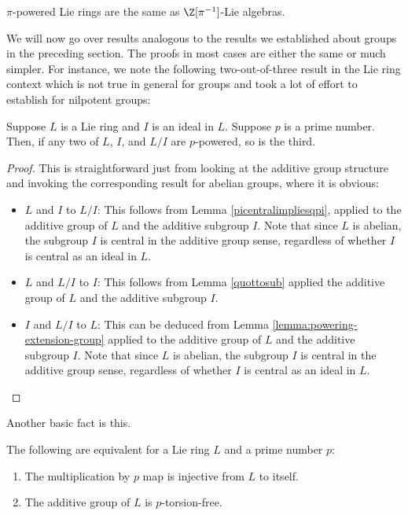 \documentclass{ucetd}
\begin{document}
$\pi$-powered Lie rings are the same as $\Z[\pi^{-1}]$-Lie
algebras. %

We will now go over results analogous to the results we established
about groups in the preceding section. The proofs in most cases are
either the same or much simpler. For instance, we note the following
two-out-of-three result in the Lie ring context which is not true in
general for groups and took a lot of effort to establish for nilpotent groups:

\begin{lemma}\label{lemma:two-out-of-three-lie}
  Suppose $L$ is a Lie ring and $I$ is an ideal in $L$. Suppose $p$ is
  a prime number. Then, if any two of $L$, $I$, and $L/I$ are $p$-powered,
  so is the third.
\end{lemma}

\begin{proof}
  This is straightforward just from looking at the additive group
  structure and invoking the corresponding result for abelian groups,
  where it is obvious:

  \begin{itemize}
  \item $L$ and $I$ to $L/I$: This follows from Lemma
    \ref{picentralimpliesqpi}, applied to the additive group of $L$
    and the additive subgroup $I$.  Note that since $L$ is abelian,
    the subgroup $I$ is central in the additive group sense,
    regardless of whether $I$ is central as an ideal in $L$.
  \item $L$ and $L/I$ to $I$: This follows from Lemma \ref{quottosub}
    applied the additive group of $L$ and the additive subgroup $I$.
  \item $I$ and $L/I$ to $L$: This can be deduced from Lemma
    \ref{lemma:powering-extension-group} applied to the additive group of
    $L$ and the additive subgroup $I$. Note that since $L$ is abelian,
    the subgroup $I$ is central in the additive group sense,
    regardless of whether $I$ is central as an ideal in $L$.
  \end{itemize}
\end{proof}

Another basic fact is this.

\begin{lemma}
  The following are equivalent for a Lie ring $L$ and a prime number $p$:

  \begin{enumerate}
  \item The multiplication by $p$ map is injective from $L$ to itself.
  \item The additive group of $L$ is $p$-torsion-free.
  \end{enumerate}
\end{lemma}
\end{document}
